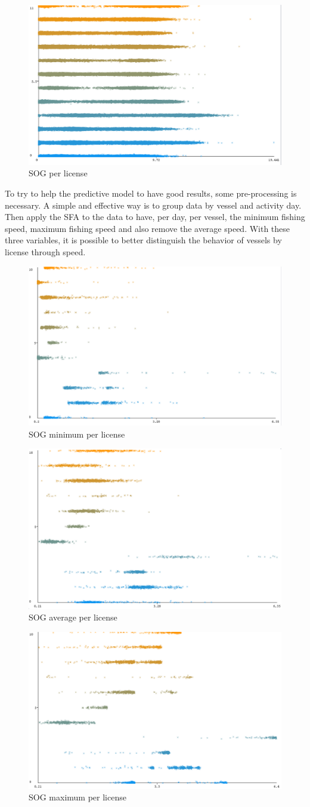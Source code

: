 \begin{figure}[H]
\centering
\includegraphics[width=0.5\linewidth]{Chapters/img/sog_all_2.png}
\caption{SOG per license}
\label{fig:sogall}
\end{figure}

To try to help the predictive model to have good results, some pre-processing is necessary. A simple and effective way is to group data by vessel and activity day. Then apply the SFA to the data to have, per day, per vessel, the minimum fishing speed, maximum fishing speed and also remove the average speed.
With these three variables, it is possible to better distinguish the behavior of vessels by license through speed.

\begin{figure}
\centering
\includegraphics[width=0.5\linewidth]{Chapters/img/sog_min_2.png}
\caption{SOG minimum per license}
\label{fig:sogminall}
\end{figure}
\begin{figure}
\centering
\includegraphics[width=0.5\linewidth]{Chapters/img/sog_avg_2.png}
\caption{SOG average per license}
\label{fig:sogavgall}
\end{figure}
\begin{figure}
\centering
\includegraphics[width=0.5\linewidth]{Chapters/img/sog_max_2.png}
\caption{SOG maximum per license}
\label{fig:sogmaxall}
\end{figure}


